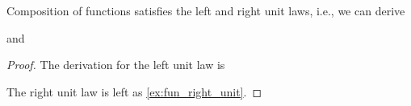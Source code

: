 \begin{lem}\label{lem:fun_unit}
Composition of functions satisfies the left and right unit laws, i.e., we can derive
\begin{prooftree}
\end{prooftree}
and
\begin{prooftree}
\end{prooftree}
\end{lem}

\begin{proof}
The derivation for the left unit law is
\begin{prooftree}
\end{prooftree}
The right unit law is left as \autoref{ex:fun_right_unit}.
\end{proof}


